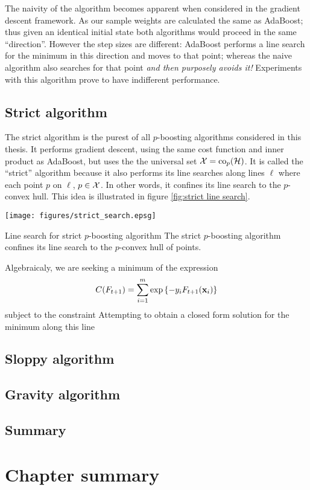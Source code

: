 The naivity of the algorithm becomes apparent when considered in
the gradient descent framework.  As our sample weights are calculated
the same as AdaBoost; thus given an identical initial state both
algorithms would proceed in the same ``direction''.  However the step
sizes are different: AdaBoost performs a line search for the minimum
in this direction and moves to that point; whereas the naive algorithm
also searches for that point \emph{and then purposely avoids it!}
Experiments with this algorithm prove to have indifferent performance.

\subsection{Strict algorithm}

The strict algorithm is the purest of all $p$-boosting algorithms
considered in this thesis.  It performs gradient descent, using the
same cost function and inner product as AdaBoost, but uses the the
universal set $\mathcal{X} = \mathrm{co}_p(\mathcal{H})$.  It is called the ``strict''
algorithm because it also performs its line searches along lines
$\ell$ where each point $p$ on $\ell$, $p \in \mathcal{X}$.  In other words,
it confines its line search to the $p$-convex hull.  This idea is
illustrated in figure \ref{fig:strict line search}.

\begin{linefigure}
\begin{center}
\texttt{[image: figures/strict\_search.epsg]}
\end{center}
\begin{capt}{Line search for strict $p$-boosting algorithm}
The strict $p$-boosting algorithm confines its line search to the
$p$-convex hull of points.
\end{capt}
\label{fig:strict line search}
\end{linefigure}

Algebraicaly, we are seeking a minimum of the expression
%
\begin{equation}
C(F_{t+1}) = \sum_{i=1}^{m} \exp \left\{ -y_i F_{t+1}(\mathbf{x}_i) \right\}
\end{equation}
%
subject to the constraint
Attempting to obtain a closed form solution for the minimum along this
line
 

\subsection{Sloppy algorithm}



\subsection{Gravity algorithm}

\subsection{Summary}

\section{Chapter summary}



